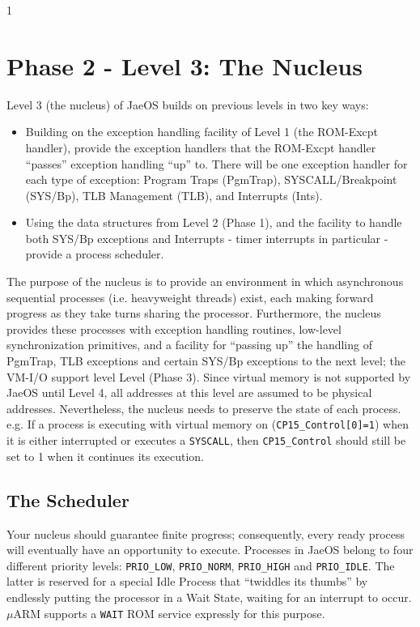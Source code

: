 \setcounter {section} {1}
\section{Phase 2 - Level 3: The Nucleus}
Level 3 (the nucleus) of JaeOS builds on previous levels in two key ways:
\begin{itemize}
\item Building on the exception handling facility of Level 1 (the ROM-Excpt
handler), provide the exception handlers
that the ROM-Excpt handler “passes” exception handling “up” to. There will be
one exception handler for each type of exception: Program Traps (PgmTrap),
SYSCALL/\linebreak Breakpoint (SYS/Bp), TLB Management (TLB), and Interrupts (Ints).
\item Using the data structures from Level 2 (Phase 1), and the facility to handle 
both SYS/Bp exceptions and Interrupts - timer interrupts in particular - provide a process scheduler.
\end{itemize}
The purpose of the nucleus is to provide an environment in which asynchronous
sequential processes (i.e. heavyweight threads) exist, each making forward progress
as they take turns sharing the processor. Furthermore, the nucleus provides these
processes with exception handling routines, low-level synchronization primitives,
and a facility for “passing up” the handling of PgmTrap, TLB exceptions and certain SYS/Bp exceptions to the next level; the VM-I/O support level Level (Phase 3).
Since virtual memory is not supported by JaeOS until Level 4, all addresses at
this level are assumed to be physical addresses. Nevertheless, the nucleus needs to
preserve the state of each process. e.g. If a process is executing with virtual memory on 
(\verb+CP15_Control[0]=1+) when it is either interrupted or executes a
\verb+SYSCALL+,
	then \verb+CP15_Control+ should still be set to 1 when it continues its execution.
\subsection{The Scheduler}
Your nucleus should guarantee finite progress; consequently, every ready process
will eventually have an opportunity to execute. Processes in JaeOS belong to four
different priority levels: \verb+PRIO_LOW+, \verb+PRIO_NORM+,
\verb+PRIO_HIGH+ and \verb+PRIO_IDLE+. The latter is reserved for a special Idle Process that 
``twiddles its thumbs'' by endlessly putting the processor in a Wait State, waiting for an 
interrupt to occur. $\mu$ARM supports a \verb+WAIT+ ROM service expressly for this purpose. 

